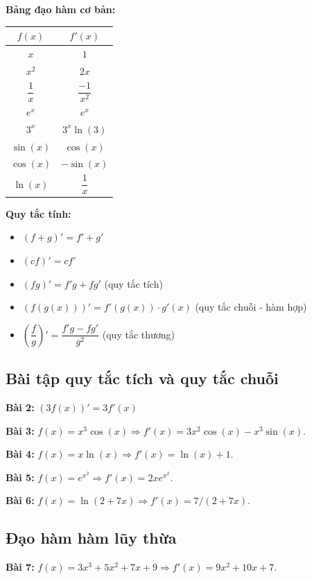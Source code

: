 \documentclass[12pt,a4paper]{article}
\begin{document}
\textbf{Bảng đạo hàm cơ bản:}

\begin{center}
\begin{tabular}{c|c}
$f(x)$ & $f'(x)$ \\ \hline
$x$ & $1$ \\
$x^2$ & $2x$ \\
$\dfrac{1}{x}$ & $\dfrac{-1}{x^2}$ \\
$e^x$ & $e^x$ \\
$3^x$ & $3^x\ln(3)$ \\
$\sin(x)$ & $\cos(x)$ \\
$\cos(x)$ & $-\sin(x)$ \\
$\ln(x)$ & $\dfrac{1}{x}$ \\
\end{tabular}
\end{center}

\textbf{Quy tắc tính:}
\begin{itemize}
\item $(f+g)' = f'+g'$
\item $(cf)' = cf'$
\item $(fg)' = f'g + fg'$ (quy tắc tích)
\item $(f(g(x)))' = f'(g(x))\cdot g'(x)$ (quy tắc chuỗi - hàm hợp)
\item $(\dfrac{f}{g})' = \dfrac{f'g-fg'}{g^2}$ (quy tắc thương)
\end{itemize}

\subsection{Bài tập quy tắc tích và quy tắc chuỗi}

\textbf{Bài 2:} $(3f(x))' = 3f'(x)$

\textbf{Bài 3:} $f(x) = x^3\cos(x) \Rightarrow f'(x) = 3x^2\cos(x) - x^3\sin(x)$.

\textbf{Bài 4:} $f(x) = x\ln(x) \Rightarrow f'(x) = \ln(x) + 1$.

\textbf{Bài 5:} $f(x) = e^{x^2} \Rightarrow f'(x) = 2xe^{x^2}$.

\textbf{Bài 6:} $f(x) = \ln(2+7x) \Rightarrow f'(x) = 7/(2+7x)$.

\subsection{Đạo hàm hàm lũy thừa}

\textbf{Bài 7:} $f(x) = 3x^3+5x^2+7x+9 \Rightarrow f'(x) = 9x^2+10x+7$.
\end{document}
